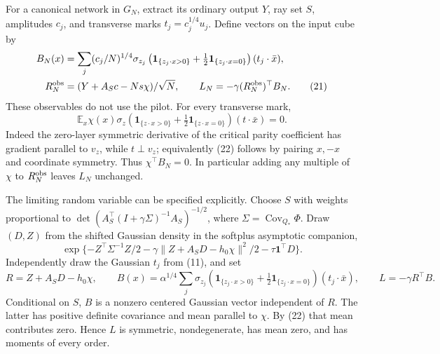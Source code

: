\documentclass[11pt]{article}
\newcommand{\E}{\mathbb E}\newcommand{\R}{\mathbb R}
\newcommand{\one}{\mathbf1}\newcommand{\TV}{\mathrm{TV}}
\begin{document}
For a canonical network in $G_N$, extract its ordinary output $Y$, ray
set $S$, amplitudes $c_j$, and transverse marks $t_j=c_j^{1/4}u_j$.
Define vectors on the input cube by
\begin{align}
 B_N(x)&=\sum_j(c_j/N)^{1/4}\sigma_{z_j}
       \left(\one_{\{z_j\cdot x>0\}}+
                  \tfrac12\one_{\{z_j\cdot x=0\}}\right)(t_j\cdot\bar x),
       \notag\\
 R_N^{\rm obs}&=(Y+A_Sc-Ns\chi)/\sqrt N,\qquad
            L_N=-\gamma (R_N^{\rm obs})^\top B_N.       \tag{21}
\end{align}
These observables do not use the pilot. For every transverse mark,
\[
 \E_x\chi(x)\sigma_z
  \left(\one_{\{z\cdot x>0\}}+\tfrac12\one_{\{z\cdot x=0\}}\right)
                                    (t\cdot\bar x)=0.  \tag{22}
\]
Indeed the zero-layer symmetric derivative of the critical parity
coefficient has gradient parallel to $v_z$, while $t\perp v_z$;
equivalently (22) follows by pairing $x,-x$ and coordinate symmetry.
Thus $\chi^\top B_N=0$. In particular adding any multiple of $\chi$
to $R_N^{\rm obs}$ leaves $L_N$ unchanged.

The limiting random variable can be specified explicitly. Choose $S$
with weights proportional to
$\det(A_S^\top(I+\gamma\Sigma)^{-1}A_S)^{-1/2}$, where
$\Sigma=\operatorname{Cov}_{Q_*}\Phi$. Draw $(D,Z)$ from the shifted
Gaussian density in the softplus asymptotic companion,
\[
 \exp\{-Z^\top\Sigma^{-1}Z/2
       -\gamma\|Z+A_SD-h_0\chi\|^2/2-\tau\one^\top D\}.
 \tag{23}
\]
Independently draw the Gaussian $t_j$ from (11), and set
\[
 R=Z+A_SD-h_0\chi,\qquad
 B(x)=\alpha^{1/4}\sum_j\sigma_{z_j}
       \left(\one_{\{z_j\cdot x>0\}}+
                   \tfrac12\one_{\{z_j\cdot x=0\}}\right)(t_j\cdot\bar x),
 \qquad L=-\gamma R^\top B.                            \tag{24}
\]
Conditional on $S$, $B$ is a nonzero centered Gaussian vector independent
of $R$. The latter has positive definite covariance and mean parallel
to $\chi$. By (22) that mean contributes zero. Hence $L$ is symmetric,
nondegenerate, has mean zero, and has moments of every order.
\end{document}
